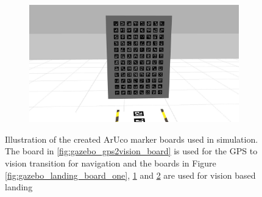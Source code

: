 \documentclass[../Head/report.tex]{subfiles}
\begin{document}
\begin{figure}[H]
\begin{subfigure}[t]{.22\textwidth}
        \caption{}
        \label{fig:gazebo_landing_board_two}
    \end{subfigure}
         \hspace{0.2em}
    \begin{subfigure}[t]{.22\textwidth}
        \centering
        \includegraphics[width=\textwidth]{../Figures/3d-modeling/gazebo_landing_board_three.jpg}
        \caption{}
        \label{fig:gazebo_landing_board_three}
    \end{subfigure}
    \caption{Illustration of the created ArUco marker boards used in simulation. The board in \ref{fig:gazebo_gps2vision_board} is used for the GPS to vision transition for navigation and the boards in Figure \ref{fig:gazebo_landing_board_one}, \ref{fig:gazebo_landing_board_two} and \ref{fig:gazebo_landing_board_three} are used for vision based landing}  
    \label{fig:gazebo_aruco_marker_boards}
\end{figure}      
\end{document}
